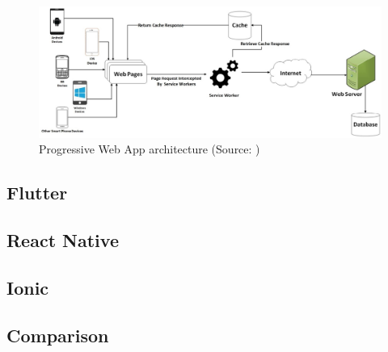 \begin{figure}[h]
	\centering
	\includegraphics[width=\textwidth]{img/pwa}
	\caption{Progressive Web App architecture (Source: \cite{dawning_pwa})}
	\label{fig:pwa_architecture}
\end{figure}

\subsection{Flutter}



\subsection{React Native}



\subsection{Ionic}



\subsection{Comparison}


